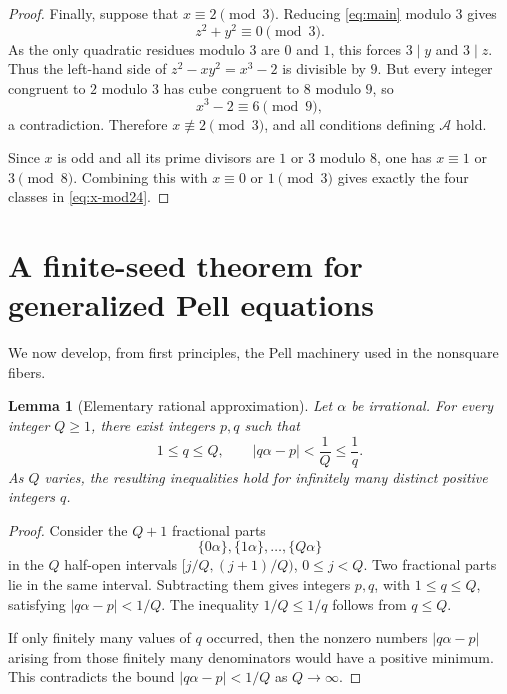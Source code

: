 \documentclass[11pt,a4paper]{amsart}
\newtheorem{lemma}[theorem]{Lemma}
\theoremstyle{definition}
\newcommand{\Acal}{\mathcal A}
\numberwithin{equation}{section}
\begin{document}
\begin{proof}
Finally, suppose that \(x\equiv2\pmod3\).  Reducing \eqref{eq:main} modulo \(3\)
gives
\begin{equation}
 z^2+y^2\equiv0\pmod3.
\end{equation}
As the only quadratic residues modulo \(3\) are \(0\) and \(1\), this forces
\(3\mid y\) and \(3\mid z\).  Thus the left-hand side of
\(z^2-xy^2=x^3-2\) is divisible by \(9\).  But every integer congruent to \(2\)
modulo \(3\) has cube congruent to \(8\) modulo \(9\), so
\begin{equation}
 x^3-2\equiv6\pmod9,
\end{equation}
a contradiction.  Therefore \(x\not\equiv2\pmod3\), and all conditions defining
\(\Acal\) hold.

Since \(x\) is odd and all its prime divisors are \(1\) or \(3\) modulo \(8\), one
has \(x\equiv1\) or \(3\pmod8\).  Combining this with
\(x\equiv0\) or \(1\pmod3\) gives exactly the four classes in
\eqref{eq:x-mod24}.
\end{proof}

\section{A finite-seed theorem for generalized Pell equations}
\label{sec:pell}

We now develop, from first principles, the Pell machinery used in the nonsquare
fibers.

\begin{lemma}[Elementary rational approximation]
\label{lem:approximation}
Let \(\alpha\) be irrational.  For every integer \(Q\geq1\), there exist integers
\(p,q\) such that
\begin{equation}
 1\leq q\leq Q,
 \qquad
 |q\alpha-p|<\frac1Q\leq\frac1q.
 \label{eq:Dirichlet}
\end{equation}
As \(Q\) varies, the resulting inequalities hold for infinitely many distinct
positive integers \(q\).
\end{lemma}

\begin{proof}
Consider the \(Q+1\) fractional parts
\begin{equation}
 \{0\alpha\},\{1\alpha\},\ldots,\{Q\alpha\}
\end{equation}
in the \(Q\) half-open intervals
\([j/Q,(j+1)/Q)\), \(0\leq j<Q\).  Two fractional parts lie in the same interval.
Subtracting them gives integers \(p,q\), with \(1\leq q\leq Q\), satisfying
\(|q\alpha-p|<1/Q\).  The inequality \(1/Q\leq1/q\) follows from \(q\leq Q\).

If only finitely many values of \(q\) occurred, then the nonzero numbers
\(|q\alpha-p|\) arising from those finitely many denominators would have a positive
minimum.  This contradicts the bound \(|q\alpha-p|<1/Q\) as \(Q\to\infty\).
\end{proof}
\end{document}
